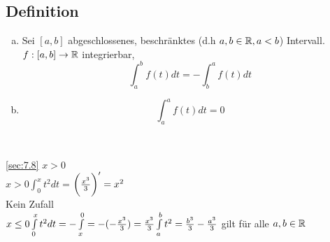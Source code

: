 \subsection{Definition}\label{sec:8.1}
\begin{enumerate}[a)]
\item Sei $[a,b]$ abgeschlossenes, beschränktes (d.h $a,b \in \mathbb{R} , a < b$) Intervall.\\
$f : [a,b] \to \mathbb{R}$ integrierbar,\\
\[ \int_{a}^{b} f(t) dt = - \int_{b}^{a} f(t) dt \]
\item \[ \int_{a}^{a} f(t) dt = 0 \]
\end{enumerate} \
\begin{table}[h!]
\centering
\begin{minipage}[t]{0.7\textwidth}
	\ref{sec:7.8} $x >0$\\
	$ x > 0 \int_{0}^{x} t^2 dt = $$ \\ \biggl(\frac{x^3}{3}\biggr)' = x^2$\\ Kein Zufall\\
	$x \le 0\\
	\int\limits_{0}^{x}t^2dt = - \int\limits_{x}^{0} = -(-\frac{x^3}{3}) = \frac{x^3}{3}\\
	\int\limits_{a}^{b}t^2 = \frac{b^3}{3} - \frac{a^3}{3}$ gilt für alle $a,b \in \mathbb{R}$
\end{minipage}
\end{table} 
